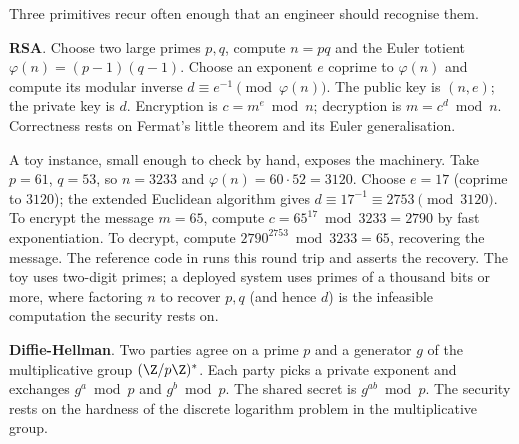 Three primitives recur often enough that an engineer should
recognise them.

\textbf{RSA}. Choose two large primes $p, q$, compute $n = pq$ and
the Euler totient $\varphi(n) = (p - 1)(q - 1)$. Choose an exponent
$e$ coprime to $\varphi(n)$ and compute its modular inverse $d
\equiv e^{-1} \pmod{\varphi(n)}$. The public key is $(n, e)$; the
private key is $d$. Encryption is $c = m^{e} \bmod n$; decryption
is $m = c^{d} \bmod n$. Correctness rests on Fermat's little
theorem and its Euler generalisation.

A toy instance, small enough to check by hand, exposes the
machinery. Take $p = 61$, $q = 53$, so $n = 3233$ and $\varphi(n) =
60 \cdot 52 = 3120$. Choose $e = 17$ (coprime to $3120$); the
extended Euclidean algorithm gives $d \equiv 17^{-1} \equiv 2753
\pmod{3120}$. To encrypt the message $m = 65$, compute $c = 65^{17}
\bmod 3233 = 2790$ by fast exponentiation. To decrypt, compute
$2790^{2753} \bmod 3233 = 65$, recovering the message. The reference
code in
runs this round trip and asserts the recovery. The toy uses
two-digit primes; a deployed system uses primes of a thousand bits
or more, where factoring $n$ to recover $p, q$ (and hence $d$) is
the infeasible computation the security rests on.

\textbf{Diffie-Hellman}. Two parties agree on a prime $p$ and a
generator $g$ of the multiplicative group $(\Z/p\Z)^{\ast}$. Each
party picks a private exponent and exchanges $g^{a} \bmod p$ and
$g^{b} \bmod p$. The shared secret is $g^{ab} \bmod p$. The
security rests on the hardness of the discrete logarithm problem
in the multiplicative group.

